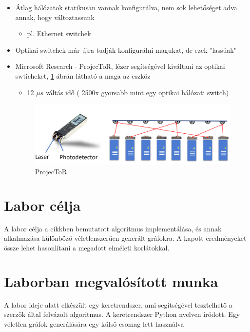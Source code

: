 \documentclass[12pt]{report}
\begin{document}
\begin{itemize}
	\item Átlag hálózatok statikusan vannak konfigurálva, nem  sok lehetőséget adva annak, hogy változtassunk 
	\begin{itemize}
		\item pl. Ethernet switchek
	\end{itemize}
	\item Optikai switchek már újra tudják konfigurálni magukat, de ezek "lassúak"
	\item Microsoft Research - ProjecToR\cite{ghobadi_projector:_2016}, lézer segítségével kiváltani az optikai swticheket, \ref{projector-fig} ábrán látható a maga az eszköz
	\begin{itemize}
		\item 12 $\mu s$ váltás idő ( 2500x gyorsabb mint egy optikai hálózati switch)
	\end{itemize}
	
	\begin{figure}[h]
		\centering
		\includegraphics[width=0.9\linewidth]{pictures/laserswitch.png}
		\caption{ProjecToR}\label{projector-fig}
	\end{figure}
	
	
\end{itemize}

\section{Labor célja}

A labor célja a cikkben\cite{avin_demand-aware_nodate} bemutatott algoritmus implementálása, és annak alkalmazása különböző véletlenszerűen generált gráfokra. 
A kapott eredményeket össze lehet hasonlítani a megadott elméleti korlátokkal.

\section{Laborban megvalósított munka}

A labor ideje alatt elkészült egy keretrendszer, ami segítségével tesztelhető a szerzők által felvázolt algoritmus. 
A keretrendszer Python \cite{noauthor_python_nodate} nyelven íródott.
Egy véletlen gráfok generálására egy külső csomag lett használva \cite{noauthor_networkx_nodate}
\end{document}
